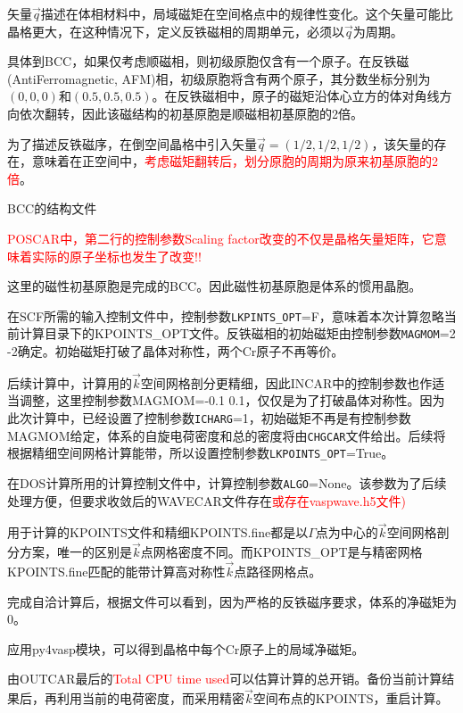 矢量$\vec q$描述在体相材料中，局域磁矩在空间格点中的规律性变化。这个矢量可能比晶格更大，在这种情况下，定义反铁磁相的周期单元，必须以$\vec q$为周期。

具体到\textrm{BCC}，如果仅考虑顺磁相，则初级原胞仅含有一个原子。在反铁磁\textrm{(AntiFerromagnetic, AFM)}相，初级原胞将含有两个原子，其分数坐标分别为$(0,0,0)$和$(0.5,0.5,0.5)$。在反铁磁相中，原子的磁矩沿体心立方的体对角线方向依次翻转，因此该磁结构的初基原胞是顺磁相初基原胞的2倍。

为了描述反铁磁序，在倒空间晶格中引入矢量$\vec q=(1/2,1/2,1/2)$，该矢量的存在，意味着在正空间中，\textcolor{red}{考虑磁矩翻转后，划分原胞的周期为原来初基原胞的2倍}。

\textrm{BCC}的结构文件

\textcolor{red}{\textrm{POSCAR}中，第二行的控制参数\textrm{Scaling factor}改变的不仅是晶格矢量矩阵，它意味着实际的原子坐标也发生了改变!!}

这里的磁性初基原胞是完成的\textrm{BCC}。因此磁性初基原胞是体系的惯用晶胞。

在\textrm{SCF}所需的输入控制文件中，控制参数\texttt{LKPINTS\_OPT}=F，意味着本次计算忽略当前计算目录下的\textrm{KPOINTS\_OPT}文件。反铁磁相的初始磁矩由控制参数\texttt{MAGMOM}=2 -2确定。初始磁矩打破了晶体对称性，两个\textrm{Cr}原子不再等价。

后续计算中，计算用的$\vec k$空间网格剖分更精细，因此\textrm{INCAR}中的控制参数也作适当调整，这里控制参数\textrm{MAGMOM}=-0.1 0.1，仅仅是为了打破晶体对称性。因为此次计算中，已经设置了控制参数\texttt{ICHARG}=1，初始磁矩不再是有控制参数\textrm{MAGMOM}给定，体系的自旋电荷密度和总的密度将由\texttt{CHGCAR}文件给出。后续将根据精细空间网格计算能带，所以设置控制参数\texttt{LKPOINTS\_OPT}=True。

在\textrm{DOS}计算所用的计算控制文件中，计算控制参数\texttt{ALGO}=None。该参数为了后续处理方便，但要求收敛后的\textrm{WAVECAR}文件存在\textcolor{red}{或存在\textrm{vaspwave.h5}文件)}

用于计算的\textrm{KPOINTS}文件和精细\textrm{KPOINTS.fine}都是以$\Gamma$点为中心的$\vec k$空间网格剖分方案，唯一的区别是$\vec k$点网格密度不同。而\textrm{KPOINTS\_OPT}是与精密网格\textrm{KPOINTS.fine}匹配的能带计算高对称性$\vec k$点路径网格点。

完成自洽计算后，根据文件可以看到，因为严格的反铁磁序要求，体系的净磁矩为0。

应用\textrm{py4vasp}模块，可以得到晶格中每个\textrm{Cr}原子上的局域净磁矩。

由\textrm{OUTCAR}最后的\textcolor{red}{\textrm{Total CPU time used}}可以估算计算的总开销。备份当前计算结果后，再利用当前的电荷密度，而采用精密$\vec k$空间布点的\textrm{KPOINTS}，重启计算。

